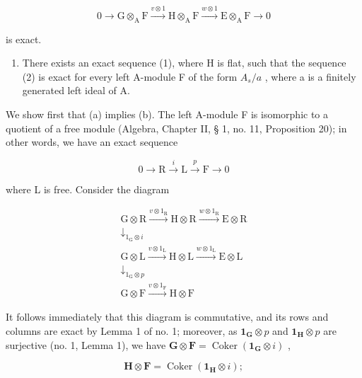 \[
0 \longrightarrow \mathrm{G} \otimes_ {\mathrm{A}} \mathrm{F} \xrightarrow {v \otimes 1} \mathrm{H} \otimes_ {\mathrm{A}} \mathrm{F} \xrightarrow {w \otimes 1} \mathrm{E} \otimes_ {\mathrm{A}} \mathrm{F} \longrightarrow 0\tag{2}
\]

is exact.

\begin{enumerate}
\def\labelenumi{(\alph{enumi})}
\setcounter{enumi}{2}
\tightlist
\item
  There exists an exact sequence (1), where H is flat, such that the sequence (2) is exact for every left A-module F of the form \(A_{s}/a\) , where a is a finitely generated left ideal of A.
\end{enumerate}

We show first that (a) implies (b). The left A-module F is isomorphic to a quotient of a free module (Algebra, Chapter II, § 1, no. 11, Proposition 20); in other words, we have an exact sequence

\[
0 \longrightarrow \mathrm{R} \stackrel {i} {\longrightarrow} \mathrm{L} \stackrel {p} {\longrightarrow} \mathrm{F} \longrightarrow 0
\]

where L is free. Consider the diagram

\[
\begin{array}{c} \mathrm{G} \otimes \mathrm{R} \xrightarrow {v \otimes 1 _ {\mathrm{R}}} \mathrm{H} \otimes \mathrm{R} \xrightarrow {w \otimes 1 _ {\mathrm{R}}} \mathrm{E} \otimes \mathrm{R} \\ \downarrow_ {1 _ {\mathrm{G}} \otimes i} \\ \mathrm{G} \otimes \mathrm{L} \xrightarrow {v \otimes 1 _ {\mathrm{L}}} \mathrm{H} \otimes \mathrm{L} \xrightarrow {w \otimes 1 _ {\mathrm{L}}} \mathrm{E} \otimes \mathrm{L} \\ \downarrow_ {1 _ {\mathrm{G}} \otimes p} \\ \mathrm{G} \otimes \mathrm{F} \xrightarrow {v \otimes 1 _ {\mathrm{F}}} \mathrm{H} \otimes \mathrm{F} \end{array}\tag{3}
\]

It follows immediately that this diagram is commutative, and its rows and columns are exact by Lemma 1 of no. 1; moreover, as \(\mathbf{1}_{\mathbf{G}} \otimes p\) and \(\mathbf{1}_{\mathbf{H}} \otimes p\) are surjective (no. 1, Lemma 1), we have \(\mathbf{G} \otimes \mathbf{F} = \operatorname{Coker}(\mathbf{1}_{\mathbf{G}} \otimes i)\) ,

\[
\mathbf {H} \otimes \mathbf {F} = \operatorname{Coker} (\mathbf {1} _ {\mathbf {H}} \otimes i);
\]

